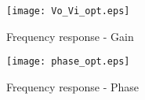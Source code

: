 \begin{figure}[H]
        \centering
        \texttt{[image: Vo\_Vi\_opt.eps]}
        \caption{Frequency response - Gain}
        \label{tfrg}
\end{figure}

\begin{figure}[H]
        \centering
        \texttt{[image: phase\_opt.eps]}
        \caption{Frequency response - Phase}
        \label{tfrf}
\end{figure}
